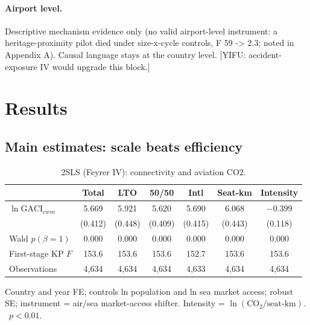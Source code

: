 \documentclass[12pt]{article}
\newcommand{\sym}[1]{\rlap{$^{#1}$}}
\begin{document}
\paragraph{Airport level.} Descriptive mechanism evidence only (no valid
airport-level instrument: a heritage-proximity pilot died under size-x-cycle
controls, F 59 -> 2.3; noted in Appendix A). Causal language stays at the
country level. [YIFU: accident-exposure IV would upgrade this block.]

\section{Results}
\subsection{Main estimates: scale beats efficiency}
\begin{table}[H]
\centering
\caption{2SLS (Feyrer IV): connectivity and aviation CO2.}
\begin{threeparttable}
\small
\begin{tabular}{lcccccc}
\toprule
 & Total & LTO & 50/50 & Intl & Seat-km & Intensity \\
\midrule
$\ln\mathrm{GACI}_{cwm}$ & 5.669\sym{***} & 5.921\sym{***} & 5.620\sym{***} & 5.690\sym{***} & 6.068\sym{***} & $-0.399$\sym{***} \\
 & (0.412) & (0.448) & (0.409) & (0.415) & (0.443) & (0.118) \\
\midrule
Wald $p(\beta=1)$ & 0.000 & 0.000 & 0.000 & 0.000 & 0.000 & 0.000 \\
First-stage KP $F$ & 153.6 & 153.6 & 153.6 & 152.7 & 153.6 & 153.6 \\
Observations & 4{,}634 & 4{,}634 & 4{,}634 & 4{,}633 & 4{,}634 & 4{,}634 \\
\bottomrule
\end{tabular}
\begin{tablenotes}\footnotesize
\item Country and year FE; controls ln population and ln sea market access;
robust SE; instrument = air/sea market-access shifter. Intensity =
$\ln(\mathrm{CO}_2/\mathrm{seat\mbox{-}km})$.
\sym{***}~$p<0.01$.
\end{tablenotes}
\end{threeparttable}
\end{table}
\end{document}
